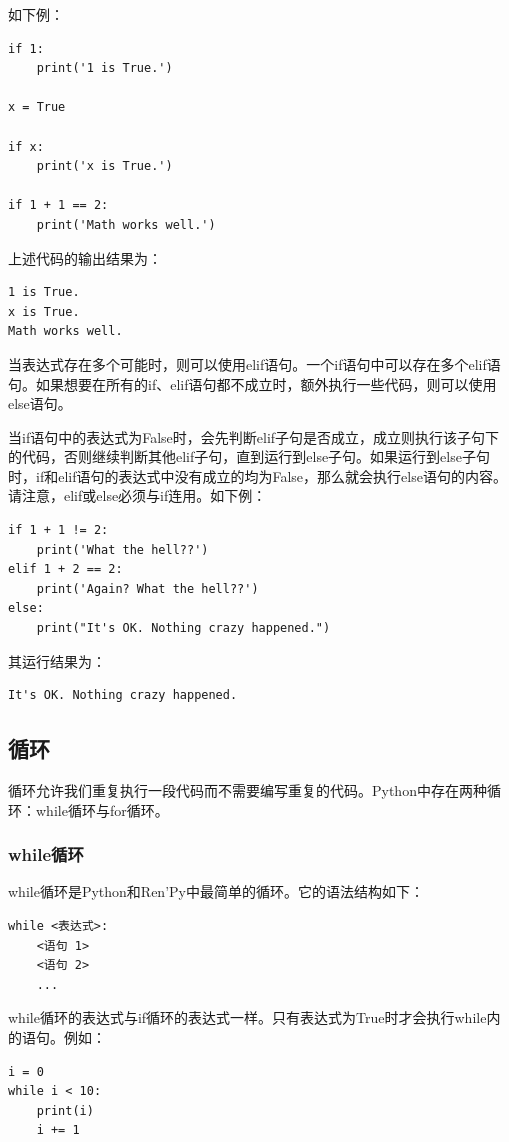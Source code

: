 \documentclass[../../Main.tex]{subfiles}
\begin{document}
如下例：

\begin{lstlisting}
if 1:
    print('1 is True.')

x = True

if x:
    print('x is True.')

if 1 + 1 == 2:
    print('Math works well.')
\end{lstlisting}

上述代码的输出结果为：
\begin{lstlisting}
1 is True.
x is True.
Math works well.
\end{lstlisting}

当表达式存在多个可能时，则可以使用elif语句。一个if语句中可以存在多个elif语句。如果想要在所有的if、elif语句都不成立时，额外执行一些代码，则可以使用else语句。

当if语句中的表达式为False时，会先判断elif子句是否成立，成立则执行该子句下的代码，否则继续判断其他elif子句，直到运行到else子句。如果运行到else子句时，if和elif语句的表达式中没有成立的均为False，那么就会执行else语句的内容。请注意，elif或else必须与if连用。如下例：

\begin{lstlisting}
if 1 + 1 != 2:
    print('What the hell??')
elif 1 + 2 == 2:
    print('Again? What the hell??')
else:
    print("It's OK. Nothing crazy happened.")
\end{lstlisting}

其运行结果为：
\begin{lstlisting}
It's OK. Nothing crazy happened.
\end{lstlisting}

\subsection{循环}
循环允许我们重复执行一段代码而不需要编写重复的代码。Python中存在两种循环：while循环与for循环。

\subsubsection{while循环}
while循环是Python和Ren'Py中最简单的循环。它的语法结构如下：
\begin{lstlisting}
while <表达式>:
    <语句 1>
    <语句 2>
    ...
\end{lstlisting}

while循环的表达式与if循环的表达式一样。只有表达式为True时才会执行while内的语句。例如：

\begin{lstlisting}
i = 0
while i < 10:
    print(i)
    i += 1
\end{lstlisting}
\end{document}
